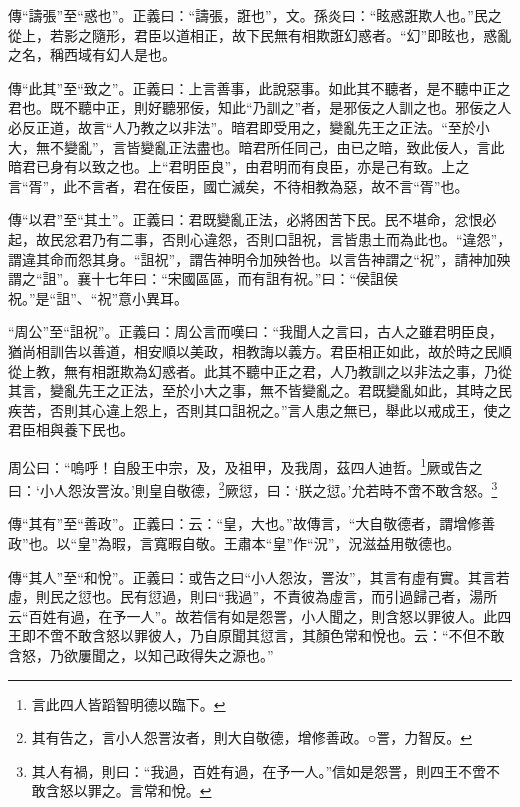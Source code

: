 {\noindent\zhuan{}\fzbyks 傳“譸張”至“惑也”。正義曰：“譸張，誑也”，文。孫炎曰：“眩惑誑欺人也。”民之從上，若影之隨形，君臣以道相正，故下民無有相欺誑幻惑者。“幻”即眩也，惑亂之名，稱西域有幻人是也。 \par}

{\noindent\zhuan{}\fzbyks 傳“此其”至“致之”。正義曰：上言善事，此說惡事。如此其不聽者，是不聽中正之君也。既不聽中正，則好聽邪佞，知此“乃訓之”者，是邪佞之人訓之也。邪佞之人必反正道，故言“人乃教之以非法”。暗君即受用之，變亂先王之正法。“至於小大，無不變亂”，言皆變亂正法盡也。暗君所任同己，由已之暗，致此佞人，言此暗君已身有以致之也。上“君明臣良”，由君明而有良臣，亦是己有致。上之言“胥”，此不言者，君在佞臣，國亡滅矣，不待相教為惡，故不言“胥”也。 \par}

{\noindent\zhuan{}\fzbyks 傳“以君”至“其土”。正義曰：君既變亂正法，必將困苦下民。民不堪命，忿恨必起，故民忿君乃有二事，否則心違怨，否則口詛祝，言皆患土而為此也。“違怨”，謂違其命而怨其身。“詛祝”，謂告神明令加殃咎也。以言告神謂之“祝”，請神加殃謂之“詛”。襄十七年曰：“宋國區區，而有詛有祝。”曰：“侯詛侯祝。”是“詛”、“祝”意小異耳。 \par}

{\noindent\shu{}\fzkt “周公”至“詛祝”。正義曰：周公言而嘆曰：“我聞人之言曰，古人之雖君明臣良，猶尚相訓告以善道，相安順以美政，相教誨以義方。君臣相正如此，故於時之民順從上教，無有相誑欺為幻惑者。此其不聽中正之君，人乃教訓之以非法之事，乃從其言，變亂先王之正法，至於小大之事，無不皆變亂之。君既變亂如此，其時之民疾苦，否則其心違上怨上，否則其口詛祝之。”言人患之無已，舉此以戒成王，使之君臣相與養下民也。 \par}

周公曰：“嗚呼！自殷王中宗，及，及祖甲，及我周，茲四人迪哲。\footnote{言此四人皆蹈智明德以臨下。}厥或告之曰：‘小人怨汝詈汝。’則皇自敬德，\footnote{其有告之，言小人怨詈汝者，則大自敬德，增修善政。○詈，力智反。}厥愆，曰：‘朕之愆。’允若時不啻不敢含怒。\footnote{其人有禍，則曰：“我過，百姓有過，在予一人。”信如是怨詈，則四王不啻不敢含怒以罪之。言常和悅。}


{\noindent\zhuan{}\fzbyks 傳“其有”至“善政”。正義曰：云：“皇，大也。”故傳言，“大自敬德者，謂增修善政”也。以“皇”為暇，言寬暇自敬。王肅本“皇”作“況”，況滋益用敬德也。 \par}

{\noindent\zhuan{}\fzbyks 傳“其人”至“和悅”。正義曰：或告之曰“小人怨汝，詈汝”，其言有虛有實。其言若虛，則民之愆也。民有愆過，則曰“我過”，不責彼為虛言，而引過歸己者，湯所云“百姓有過，在予一人”。故若信有如是怨詈，小人聞之，則含怒以罪彼人。此四王即不啻不敢含怒以罪彼人，乃自原聞其愆言，其顏色常和悅也。云：“不但不敢含怒，乃欲屢聞之，以知己政得失之源也。” \par}

